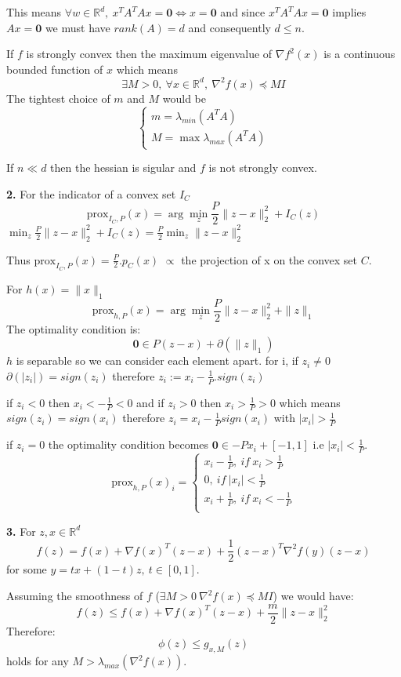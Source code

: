 \documentclass[11pt]{article}
\theoremstyle{exo}
\newcommand{\R}{\mathbb{R}}
\newcommand{\1}{\mathbf{1}}
\newcommand{\0}{\mathbf{0}}
\begin{document}
This means $\forall w\in\R^d,\:x^TA^TAx=\0\iff x=\0$ and since $x^TA^TAx=\0$ implies $Ax=\0$ we must have $rank(A)=d$ and consequently $d\leq n$.

If $f$ is strongly convex then the maximum eigenvalue of $\nabla f^2(x)$ is a continuous bounded function of $x$ which means
\[\exists M>0,\:\forall x\in\R^d,\:\nabla^2f(x)\preceq MI\]
The tightest choice of $m$ and $M$ would be 
\[\begin{cases}
m=\lambda_{min}(A^TA)\\
M=\max \lambda_{max}(A^TA)
\end{cases}\]

If $n\ll d$ then the hessian is sigular and $f$ is not strongly convex. 

\textbf{2.} For the indicator of a convex set $I_C$
\[\text{prox}_{I_C,P}(x)=\arg\min_z\frac{P}{2}\|z-x\|_2^2+I_C(z)\]
$\min_z\frac{P}{2}\|z-x\|_2^2+I_C(z)=\frac{P}{2}\min_z\|z-x\|_2^2$

Thus $\text{prox}_{I_C,P}(x)=\frac{P}{2}.p_C(x)$ $\propto$ the projection of x on the convex set $C$. 

For $h(x)=\|x\|_1$ 
\[\text{prox}_{h,P}(x)=\arg\min_z\frac{P}{2}\|z-x\|_2^2+\|z\|_1\]
The optimality condition is:
\[\0\in P(z-x)+\partial(\|z\|_1)\]
$h$ is separable so we can consider each element apart. for i, if $z_i\neq 0$ $\partial(|z_i|)=sign(z_i)$ therefore $z_i:=x_i-\frac{1}{P}.sign(z_i)$

if $z_i<0$ then $x_i<-\frac{1}{P}<0$ and if $z_i>0$ then $x_i>\frac{1}{P}>0$ which means $sign(z_i)=sign(x_i)$ therefore $z_i=x_i-\frac{1}{P}sign(x_i)$ with $|x_i|>\frac{1}{P}$

if $z_i=0$ the optimality condition becomes $\0\in -Px_i+[-1,1]$ i.e  $|x_i|<\frac{1}{P}$.
\[\text{prox}_{h,P}(x)_i=
\begin{cases}
x_i-\frac{1}{P},\:if\:x_i>\frac{1}{P}\\
0,\:if\:|x_i|<\frac{1}{P}\\
x_i+\frac{1}{P},\:if\:x_i<-\frac{1}{P}\\
\end{cases}\]

\textbf{3.} For $z,x\in\R^d$
\[f(z)=f(x)+\nabla f(x)^T(z-x)+\frac{1}{2}(z-x)^T\nabla^2f(y)(z-x)\]
for some $y=tx+(1-t)z,\:t\in[0,1]$.

Assuming the smoothness of $f$ ($\exists M>0\:\nabla^2f(x)\preceq MI$) we would have:
\[f(z)\leq f(x)+\nabla f(x)^T(z-x)+\frac{m}{2}\|z-x\|_2^2\]
Therefore:
\[\phi(z)\leq g_{x,M}(z) \]
holds for any $M>\lambda_{max}(\nabla^2f(x))$.
\end{document}
